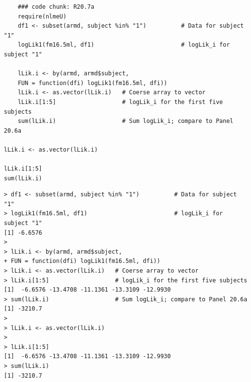 \documentclass[a4paper,12pt]{article}
\begin{document}

\begin{framed}
	\begin{verbatim}
	### code chunk: R20.7a
	require(nlmeU)  
	df1 <- subset(armd, subject %in% "1")          # Data for subject "1" 
	logLik1(fm16.5ml, df1)                         # logLik_i for subject "1" 
	
	lLik.i <- by(armd, armd$subject,
	FUN = function(dfi) logLik1(fm16.5ml, dfi))
	lLik.i <- as.vector(lLik.i)   # Coerse array to vector  
	lLik.i[1:5]                   # logLik_i for the first five subjects
	sum(lLik.i)                   # Sum logLik_i; compare to Panel 20.6a
	
lLik.i <- as.vector(lLik.i)

lLik.i[1:5]
sum(lLik.i)

\end{verbatim}
\end{framed}
\begin{verbatim}
> df1 <- subset(armd, subject %in% "1")          # Data for subject "1" 
> logLik1(fm16.5ml, df1)                         # logLik_i for subject "1" 
[1] -6.6576
> 
> lLik.i <- by(armd, armd$subject,
+ FUN = function(dfi) logLik1(fm16.5ml, dfi))
> lLik.i <- as.vector(lLik.i)   # Coerse array to vector  
> lLik.i[1:5]                   # logLik_i for the first five subjects
[1]  -6.6576 -13.4708 -11.1361 -13.3109 -12.9930
> sum(lLik.i)                   # Sum logLik_i; compare to Panel 20.6a
[1] -3210.7
> 
> lLik.i <- as.vector(lLik.i)
> 
> lLik.i[1:5]
[1]  -6.6576 -13.4708 -11.1361 -13.3109 -12.9930
> sum(lLik.i)
[1] -3210.7

\end{verbatim}
\end{document}
